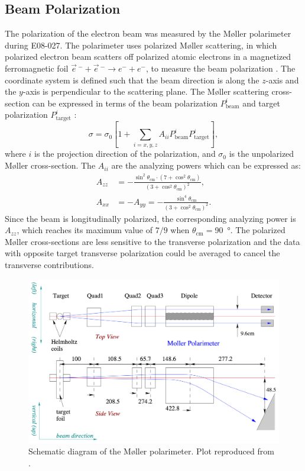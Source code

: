 \subsection{Beam Polarization}
\label{C5S2SS4}

The polarization of the electron beam was measured by the M{\o}ller polarimeter during E08-027. The polarimeter uses polarized M{\o}ller scattering, in which polarized electron beam scatters off polarized atomic electrons in a magnetized ferromagnetic foil $\vec{e}\,^-+\vec{e}\,^-\rightarrow e^-+e^-$, to measure the beam polarization \cite{MOLLER,Alcorn2004}. The coordinate system is defined such that the beam direction is along the $z$-axis and the $y$-axis is perpendicular to the scattering plane. The M{\o}ller scattering cross-section can be expressed in terms of the beam polarization $P_{\mathrm{beam}}^i$ and target polarization $P_{\mathrm{target}}^i$ \cite{Alcorn2004}:
\begin{equation} \label{C5S2SS4E1}
\sigma = \sigma_0\left[1+\sum_{i=x,y,z}A_{ii}P_{\mathrm{beam}}^iP_{\mathrm{target}}^i\right],
\end{equation}
where $i$ is the projection direction of the polarization, and $\sigma_0$ is the unpolarized M{\o}ller cross-section. The $A_{ii}$ are the analyzing powers which can be expressed as:
\begin{align} \label{C5S2SS4E2}
A_{zz} & = -\frac{\sin^2\theta_{\mathrm{cm}}\cdot(7+\cos^2\theta_{\mathrm{cm}})}{(3+\cos^2\theta_{\mathrm{cm}})^2}, \\ \label{C5S2SS4E3}
A_{xx} & = -A_{yy} =  -\frac{\sin^4\theta_{\mathrm{cm}}}{(3+\cos^2\theta_{\mathrm{cm}})^2}.
\end{align}
Since the beam is longitudinally polarized, the corresponding analyzing power is $A_{zz}$, which reaches its maximum value of $7/9$ when $\theta_{\mathrm{cm}}=$\SI{90}{\degree}. The polarized M{\o}ller cross-sections are less sensitive to the transverse polarization and the data with opposite target transverse polarization could be averaged to cancel the transverse contributions.

\begin{figure}[b!]
  \centering
  \includegraphics[width=\textwidth]{figs/moller.png}
  \caption[Schematic diagram of the M{\o}ller polarimeter.]{Schematic diagram of the M{\o}ller polarimeter. Plot reproduced from \cite{Zheng2002}. \label{C5S2SS4F1}}
\end{figure}

